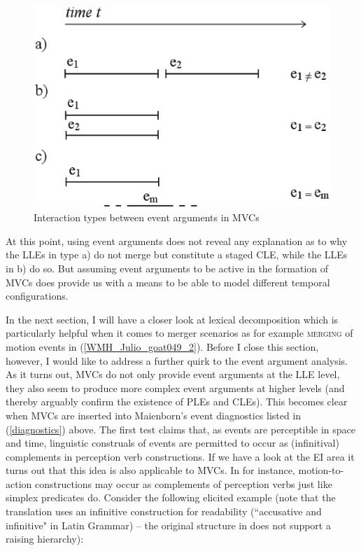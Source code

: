 \begin{figure}
\includegraphics[width=1.0\textwidth]{figures/eventschemav2.eps} 
\caption{Interaction types between event arguments in MVCs}\label{fig:eventsmod}
\end{figure}

At this point, using event arguments does not reveal any explanation as to why the LLEs in type a) do not merge but constitute a staged CLE, while the LLEs in b) do so. But assuming event arguments to be active in the formation of MVCs does provide us with a means to be able to model different temporal configurations.

In the next section, I will have a closer look at lexical decomposition which is particularly helpful when it comes to  merger scenarios as for example \textsc{merging} of motion events in (\ref{WMH_Julio_goat049_2}). Before I close this section, however, I would like to address a further quirk to the event argument analysis. As it turns out, MVCs do not only provide event arguments at the LLE level, they also seem to produce more complex event arguments at higher levels (and thereby arguably confirm the existence of PLEs and CLEs). This becomes clear when MVCs are inserted into Maienborn's event diagnostics listed in (\ref{diagnostics}) above. The first test claims that, as events are perceptible in space and time, linguistic construals of events are permitted to occur as (infinitival) complements in perception verb constructions. If we have a look at the EI area it turns out that this idea is also applicable to MVCs. In  for instance, motion-to-action constructions may occur as complements of perception verbs just like simplex predicates do. Consider the following elicited example (note that the  translation uses an infinitive construction for readability (``accusative and infinitive" in Latin Grammar) -- the original structure in  does not support a raising hierarchy):
\newpage

